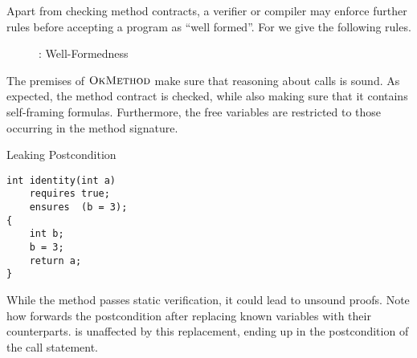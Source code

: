 Apart from checking method contracts, a verifier or compiler may enforce further rules before accepting a program as “well formed”.
For \svlidf we give the following rules.

\begin{figure}[h]
    
    \caption{\svlidf: Well-Formedness}
    \label{fig:idf-wf}
\end{figure}

The premises of $\textup{\textsc{OkMethod}}$ make sure that reasoning about calls is sound.
As expected, the method contract is checked, while also making sure that it contains self-framing formulas.
Furthermore, the free variables are restricted to those occurring in the method signature.

\begin{example}{Leaking Postcondition}
\begin{lstlisting}
int identity(int a)
    requires true;
    ensures  (b = 3);
{
    int b;
    b = 3;
    return a;
}
\end{lstlisting}
While the method passes static verification, it could lead to unsound proofs.
Note how  forwards the postcondition after replacing known variables with their counterparts.
 is unaffected by this replacement, ending up in the postcondition of the call statement.
\end{example}